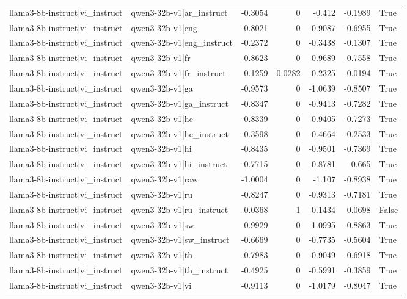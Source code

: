 \begin{table}
\begin{tabular}{l l r r r r l}
llama3-8b-instruct|vi_instruct & qwen3-32b-v1|ar_instruct & -0.3054 & 0 & -0.412 & -0.1989 & True \\
llama3-8b-instruct|vi_instruct & qwen3-32b-v1|eng & -0.8021 & 0 & -0.9087 & -0.6955 & True \\
llama3-8b-instruct|vi_instruct & qwen3-32b-v1|eng_instruct & -0.2372 & 0 & -0.3438 & -0.1307 & True \\
llama3-8b-instruct|vi_instruct & qwen3-32b-v1|fr & -0.8623 & 0 & -0.9689 & -0.7558 & True \\
llama3-8b-instruct|vi_instruct & qwen3-32b-v1|fr_instruct & -0.1259 & 0.0282 & -0.2325 & -0.0194 & True \\
llama3-8b-instruct|vi_instruct & qwen3-32b-v1|ga & -0.9573 & 0 & -1.0639 & -0.8507 & True \\
llama3-8b-instruct|vi_instruct & qwen3-32b-v1|ga_instruct & -0.8347 & 0 & -0.9413 & -0.7282 & True \\
llama3-8b-instruct|vi_instruct & qwen3-32b-v1|he & -0.8339 & 0 & -0.9405 & -0.7273 & True \\
llama3-8b-instruct|vi_instruct & qwen3-32b-v1|he_instruct & -0.3598 & 0 & -0.4664 & -0.2533 & True \\
llama3-8b-instruct|vi_instruct & qwen3-32b-v1|hi & -0.8435 & 0 & -0.9501 & -0.7369 & True \\
llama3-8b-instruct|vi_instruct & qwen3-32b-v1|hi_instruct & -0.7715 & 0 & -0.8781 & -0.665 & True \\
llama3-8b-instruct|vi_instruct & qwen3-32b-v1|raw & -1.0004 & 0 & -1.107 & -0.8938 & True \\
llama3-8b-instruct|vi_instruct & qwen3-32b-v1|ru & -0.8247 & 0 & -0.9313 & -0.7181 & True \\
llama3-8b-instruct|vi_instruct & qwen3-32b-v1|ru_instruct & -0.0368 & 1 & -0.1434 & 0.0698 & False \\
llama3-8b-instruct|vi_instruct & qwen3-32b-v1|sw & -0.9929 & 0 & -1.0995 & -0.8863 & True \\
llama3-8b-instruct|vi_instruct & qwen3-32b-v1|sw_instruct & -0.6669 & 0 & -0.7735 & -0.5604 & True \\
llama3-8b-instruct|vi_instruct & qwen3-32b-v1|th & -0.7983 & 0 & -0.9049 & -0.6918 & True \\
llama3-8b-instruct|vi_instruct & qwen3-32b-v1|th_instruct & -0.4925 & 0 & -0.5991 & -0.3859 & True \\
llama3-8b-instruct|vi_instruct & qwen3-32b-v1|vi & -0.9113 & 0 & -1.0179 & -0.8047 & True \\

\end{tabular}
\end{table}

